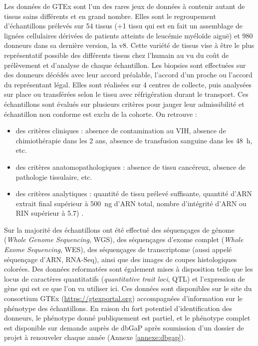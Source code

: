 Les données de GTEx sont l'un des rares jeux de données à contenir autant de tissus sains différents et en grand nombre. Elles sont le regroupement d'échantillons prélevés sur 54 tissus (+1 tissu qui est en fait un assemblage de lignées cellulaires dérivées de patients atteints de leucémie myéloïde aiguë) et 980 donneurs dans sa dernière version, la v8. Cette variété de tissus vise à être le plus représentatif possible des différents tissus chez l'humain au vu du coût de prélèvement et d'analyse de chaque échantillon. Les biopsies sont effectuées sur des donneurs décédés avec leur accord préalable, l'accord d'un proche ou l'accord du représentant légal. Elles sont réalisées sur 4 centres de collecte, puis analysées sur place ou transférées selon le tissu avec réfrigération durant le transport. Ces échantillons sont évalués sur plusieurs critères pour jauger leur admissibilité et échantillon non conforme est exclu de la cohorte. On retrouve : 
\begin{itemize}
    \item des critères cliniques : absence de contamination au VIH, absence de chimiothérapie dans les 2 ans, absence de transfusion sanguine dans les 48 h, etc.
    \item des critères anatomopathologiques : absence de tissu cancéreux, absence de pathologie tissulaire, etc.
    \item des critères analytiques : quantité de tissu prélevé suffisante, quantité d'ARN extrait final supérieur à 500 ng d'ARN total, nombre d'intégrité d'ARN ou RIN supérieur à 5.7) . 
\end{itemize}

Sur la majorité des échantillons ont été effectué des séquençages de génome (\textit{Whole Genome Sequencing}, WGS), des séquençages d'exome complet (\textit{Whole Exome Sequencing}, WES), des séquençages de transcriptome (aussi appelé séquençage d'ARN, RNA-Seq), ainsi que des images de coupes histologiques colorées. Des données reformatées sont également mises à disposition telle que les locus de caractères quantitatifs (\textit{quantitative trait loci}, QTL) et l'expression de gène qui est ce que l'on va utiliser ici. Ces données sont disponibles sur le site du consortium GTEx (\url{https://gtexportal.org}) accompagnées d'information sur le phénotype des échantillons. En raison du fort potentiel d'identification des donneurs, le phénotype donné publiquement est partiel, et le phénotype complet est disponible sur demande auprès de dbGaP après soumission d'un dossier de projet à renouveler chaque année (Annexe \ref{annexe:dbgap}).


